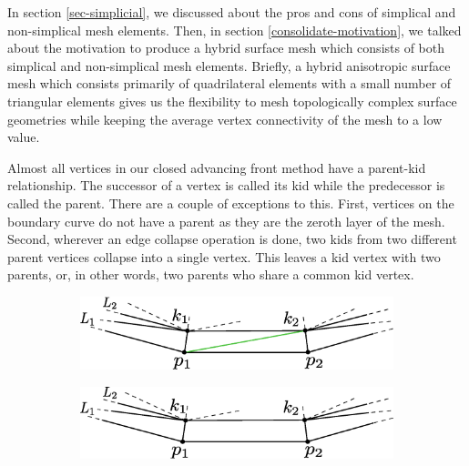 In section \ref{sec-simplicial}, we discussed about the pros and cons of simplical and non-simplical mesh elements. Then, in section \ref{consolidate-motivation}, we talked about the motivation to produce a hybrid surface mesh which consists of both simplical and non-simplical mesh elements. Briefly, a hybrid anisotropic surface mesh which consists primarily of quadrilateral elements with a small number of triangular elements gives us the flexibility to mesh topologically complex surface geometries while keeping the average vertex connectivity of the mesh to a low value.

Almost all vertices in our closed advancing front method have a parent-kid relationship. The successor of a vertex is called its kid while the predecessor is called the parent. There are a couple of exceptions to this. First, vertices on the boundary curve do not have a parent as they are the zeroth layer of the mesh. Second, wherever an edge collapse operation is done, two kids from two different parent vertices collapse into a single vertex. This leaves a kid vertex with two parents, or, in other words, two parents who share a common kid vertex.

\vspace{10pt}
\begin{figure}[hbt!]
\centering
\begin{subfigure}{\textwidth}
  \centering
  \includegraphics[width=.7\linewidth]{img/m2/combineTriToQuad.eps}
  \caption{}
  \label{triToQuad1}
\end{subfigure}
\begin{subfigure}{\textwidth}
  \centering
  \includegraphics[width=.7\linewidth]{img/m2/combineTriToQuad2.eps}
  \caption{}
  \label{triToQuad2}
\end{subfigure}
\caption{}
\label{triToQuad}
\end{figure}

